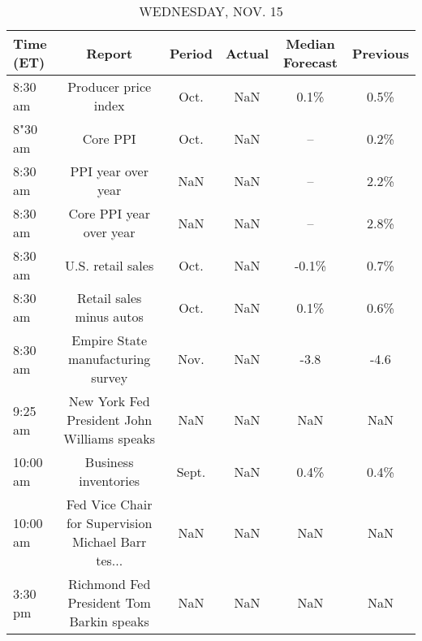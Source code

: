 \documentclass{article}%
\begin{document}
%


\begin{table}[htbp]%
\caption{WEDNESDAY, NOV. 15}%
\centering%
\begin{adjustbox}{width=1\textwidth}%
\begin{tabular}{lccccc}
\toprule
Time (ET) &                                             Report & Period & Actual & Median Forecast & Previous \\
\midrule
  8:30 am &                               Producer price index &   Oct. &    NaN &            0.1\% &     0.5\% \\
  8"30 am &                                           Core PPI &   Oct. &    NaN &              -- &     0.2\% \\
  8:30 am &                                 PPI year over year &    NaN &    NaN &              -- &     2.2\% \\
  8:30 am &                            Core PPI year over year &    NaN &    NaN &              -- &     2.8\% \\
  8:30 am &                                  U.S. retail sales &   Oct. &    NaN &           -0.1\% &     0.7\% \\
  8:30 am &                           Retail sales minus autos &   Oct. &    NaN &            0.1\% &     0.6\% \\
  8:30 am &                  Empire State manufacturing survey &   Nov. &    NaN &            -3.8 &     -4.6 \\
  9:25 am &        New York Fed President John Williams speaks &    NaN &    NaN &             NaN &      NaN \\
 10:00 am &                               Business inventories &  Sept. &    NaN &            0.4\% &     0.4\% \\
 10:00 am & Fed Vice Chair for Supervision Michael Barr tes... &    NaN &    NaN &             NaN &      NaN \\
  3:30 pm &           Richmond Fed President Tom Barkin speaks &    NaN &    NaN &             NaN &      NaN \\
\bottomrule
\end{tabular}
%
\end{adjustbox}%
\end{table}

%
\end{document}
